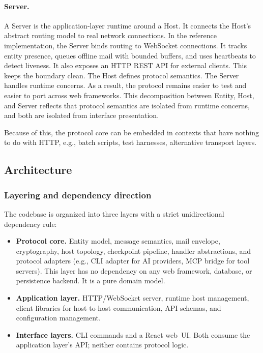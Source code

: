 \paragraph{Server.}
A Server is the application-layer runtime around a Host. It connects the Host's abstract routing model to real network connections. In the reference implementation, the Server binds routing to WebSocket connections.
It tracks entity presence, queues offline mail with bounded buffers, and uses heartbeats to detect liveness. It also exposes an HTTP REST API for external clients.
This keeps the boundary clean. The Host defines protocol semantics. The Server handles runtime concerns. As a result, the protocol remains easier to test and easier to port across web frameworks.
\medskip
\noindent This decomposition between Entity, Host, and
Server reflects that protocol semantics are
isolated from runtime concerns, and both are isolated from interface presentation. 

Because of this, the protocol core can be embedded in contexts that have nothing to do with HTTP, e.g., batch scripts, test harnesses, alternative transport layers.

\subsection{Architecture}
\label{app:architecture}

\subsubsection{Layering and dependency direction}

The codebase is organized into three layers with a strict unidirectional
dependency rule:

\begin{itemize}
    \item \textbf{Protocol core.}  Entity model, message semantics, mail
      envelope, cryptography, host topology, checkpoint pipeline, handler
      abstractions, and protocol adapters (e.g., CLI adapter for AI
      providers, MCP bridge for tool servers).  This layer has no
      dependency on any web framework, database, or persistence backend.
      It is a pure domain model.

    \item \textbf{Application layer.}  HTTP/WebSocket server, runtime
      host management, client libraries for host-to-host communication,
      API schemas, and configuration management.

    \item \textbf{Interface layers.}  CLI commands and a React web~UI.
      Both consume the application layer's API; neither contains protocol
      logic.
\end{itemize}

